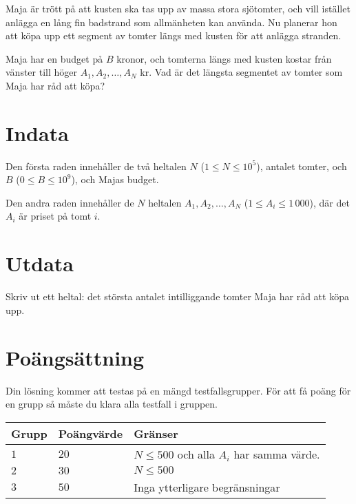 Maja är trött på att kusten ska tas upp av massa stora sjötomter, och vill istället anlägga en lång fin badstrand som allmänheten kan använda.
Nu planerar hon att köpa upp ett segment av tomter längs med kusten för att anlägga stranden.

Maja har en budget på $B$ kronor, och tomterna längs med kusten kostar från vänster till höger $A_1,A_2,\dots,A_N$ kr.
Vad är det längsta segmentet av tomter som Maja har råd att köpa?

\section*{Indata}
Den första raden innehåller de två heltalen $N$ ($1\leq N \leq 10^5$), antalet tomter, och $B$ ($0 \leq B \leq 10^9$), och Majas budget.

Den andra raden innehåller de $N$ heltalen $A_1,A_2, \dots, A_N$ ($1 \le A_i \le 1\,000$), där det $A_i$ är priset på tomt $i$.

\section*{Utdata}
Skriv ut ett heltal: det största antalet intilliggande tomter Maja har råd att köpa upp.

\section*{Poängsättning}
Din lösning kommer att testas på en mängd testfallsgrupper.
För att få poäng för en grupp så måste du klara alla testfall i gruppen.

\noindent
\begin{tabular}{| l | l | p{12cm} |}
  \hline
  Grupp & Poängvärde & Gränser \\ \hline
  $1$   & $20$       & $N \leq 500 $ och alla $A_i$ har samma värde.\\ \hline
  $2$   & $30$       & $N \leq 500 $\\ \hline
  $3$   & $50$       & Inga ytterligare begränsningar \\ \hline
\end{tabular}
